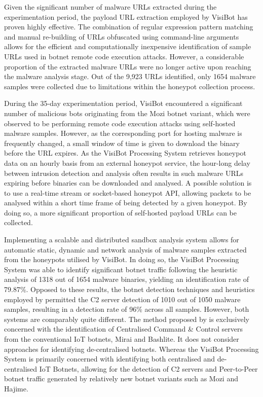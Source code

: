Given the significant number of malware URLs extracted during the experimentation period, the payload URL extraction employed by VisiBot has proven highly effective. The combination of regular expression pattern matching and manual re-building of URLs obfuscated using command-line arguments allows for the efficient and computationally inexpensive identification of sample URLs used in botnet remote code execution attacks. However, a considerable proportion of the extracted malware URLs were no longer active upon reaching the malware analysis stage. Out of the 9,923 URLs identified, only 1654 malware samples were collected due to limitations within the honeypot collection process.

During the 35-day experimentation period, VisiBot encountered a significant number of malicious bots originating from the Mozi botnet variant, which were observed to be performing remote code execution attacks using self-hosted malware samples. However, as the corresponding port for hosting malware is frequently changed, a small window of time is given to download the binary before the URL expires. As the VisiBot Processing System retrieves honeypot data on an hourly basis from an external honeypot service, the hour-long delay between intrusion detection and analysis often results in such malware URLs expiring before binaries can be downloaded and analysed. A possible solution is to use a real-time stream or socket-based honeypot API, allowing packets to be analysed within a short time frame of being detected by a given honeypot. By doing so, a more significant proportion of self-hosted payload URLs can be collected.

Implementing a scalable and distributed sandbox analysis system allows for automatic static, dynamic and network analysis of malware samples extracted from the honeypots utilised by VisiBot. In doing so, the VisiBot Processing System was able to identify significant botnet traffic following the heuristic analysis of 1318 out of 1654 malware binaries, yielding an identification rate of 79.87\%. Opposed to these results, the botnet detection techniques and heuristics employed by \citet{Bastos2019} permitted the C2 server detection of 1010 out of 1050 malware samples, resulting in a detection rate of 96\% across all samples. However, both systems are comparably quite different.  The method proposed by \citet{Bastos2019} is exclusively concerned with the identification of Centralised Command \& Control servers from the conventional IoT botnets, Mirai and Bashlite. It does not consider approaches for identifying de-centralised botnets. Whereas the VisiBot Processing System is primarily concerned with identifying both centralised and de-centralised IoT Botnets, allowing for the detection of C2 servers and Peer-to-Peer botnet traffic generated by relatively new botnet variants such as Mozi and Hajime.

